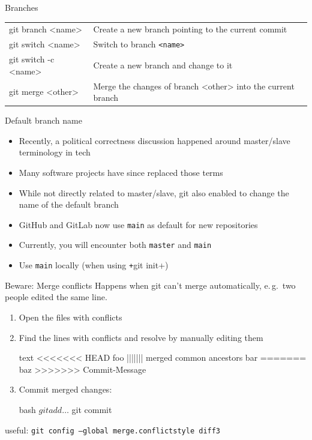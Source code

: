 \begin{frame}{Branches}
  \begin{tabu}{>{\ttfamily}l X[,L]}
    git branch <name> & Create a new branch pointing to the current commit\\
    git switch <name> & Switch to branch \texttt{<name>} \\
    git switch -c <name> & Create a new branch and change to it \\
    git merge <other> & Merge the changes of branch <other> into the current branch
  \end{tabu}
\end{frame}

\begin{frame}[c, fragile]{Default branch name}

  \begin{itemize}
    \item Recently, a political correctness discussion happened around  master/slave terminology in tech
    \item Many software projects have since replaced those terms
    \item While not directly related to master/slave, git also enabled to change the name of the default branch
    \item GitHub and GitLab now use \texttt{main} as default for new repositories
    \item Currently, you will encounter both \texttt{master} and \texttt{main}
    \item Use \texttt{main} locally (when using \texttt+git init+)
  \end{itemize}

\end{frame}

\begin{frame}[fragile]{Beware: Merge conflicts}
  Happens when git can't merge automatically, e.\,g.\ two people edited the same line.

  \begin{enumerate}
    \item Open the files with conflicts
    \item Find the lines with conflicts and resolve by manually editing them
      \begin{code}{text}
        <<<<<<< HEAD
        foo
        ||||||| merged common ancestors
        bar
        =======
        baz
        >>>>>>> Commit-Message
      \end{code}
    \item Commit merged changes:
      \begin{code}{bash}
        $ git add …
        $ git commit
      \end{code}
  \end{enumerate}
  useful: \texttt{git config --global merge.conflictstyle diff3}
\end{frame}

